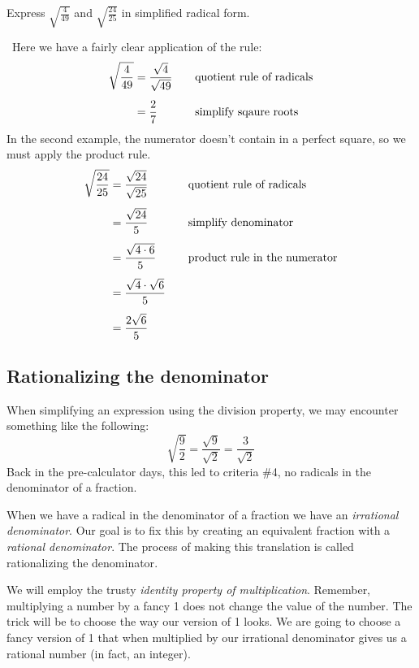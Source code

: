 \begin{boxedex}
Express $\sqrt{\frac{4}{49}}$ and $\sqrt{\frac{24}{25}}$ in simplified radical form.

\exsoln\ Here we have a fairly clear application of the rule:
\[\begin{aligned}
\sqrt{\frac{4}{49}}	&= \frac{\sqrt{4}}{\sqrt{49}}
&& \text{\quad quotient rule of radicals}\\[1ex]
&= \frac{2}{7}
&& \text{\quad simplify sqaure roots}\\
\end{aligned}
\]
In the second example, the numerator doesn't contain in a perfect square, so we must apply the product rule.
\[\begin{aligned}
\sqrt{\frac{24}{25}}	&= \frac{\sqrt{24}}{\sqrt{25}}
&& \text{\quad quotient rule of radicals}\\[1ex]
&= \frac{\sqrt{24}}{5}
&& \text{\quad simplify denominator}\\[1ex]
&= \frac{\sqrt{4\cdot6}}{5}
&& \text{\quad product rule in the numerator}\\[1ex]
&= \frac{\sqrt{4}\cdot\sqrt{6}}{5}\\[1ex]
&= \frac{2\sqrt{6}}{5}
\end{aligned}
\]
\end{boxedex}

\subsection{Rationalizing the denominator}

When simplifying an expression using the division property, we may encounter something like the following: \[\sqrt{\frac{9}{2}} = \frac{\sqrt{9}}{\sqrt{2}} = \frac{3}{\sqrt{2}}\]
Back in the pre-calculator days, this led to criteria \#4, no radicals in the denominator of a fraction.

When we have a radical in the denominator of a fraction we have an \textit{irrational denominator}. Our goal is to fix this by creating an equivalent fraction with a \textit{rational denominator}. The process of making this translation is called \gls{rationalizing the denominator}.

We will employ the trusty \textit{identity property of multiplication}. Remember, multiplying a number by a fancy 1 does not change the value of the number. The trick will be to choose the way our version of 1 looks. We are going to choose a fancy version of 1 that when multiplied by our irrational denominator gives us a rational number (in fact, an integer).

